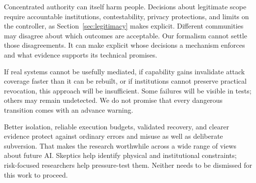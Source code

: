  Concentrated authority can itself harm people. Decisions about legitimate scope require accountable institutions, contestability, privacy protections, and limits on the controller, as Section~\ref{sec:legitimacy} makes explicit. Different communities may disagree about which outcomes are acceptable. Our formalism cannot settle those disagreements. It can make explicit whose decisions a mechanism enforces and what evidence supports its technical promises.

 If real systems cannot be usefully mediated, if capability gains invalidate attack coverage faster than it can be rebuilt, or if institutions cannot preserve practical revocation, this approach will be insufficient. Some failures will be visible in tests; others may remain undetected. We do not promise that every dangerous transition comes with an advance warning.

 Better isolation, reliable execution budgets, validated recovery, and clearer evidence protect against ordinary errors and misuse as well as deliberate subversion. That makes the research worthwhile across a wide range of views about future AI. Skeptics help identify physical and institutional constraints; risk-focused researchers help pressure-test them. Neither needs to be dismissed for this work to proceed.
